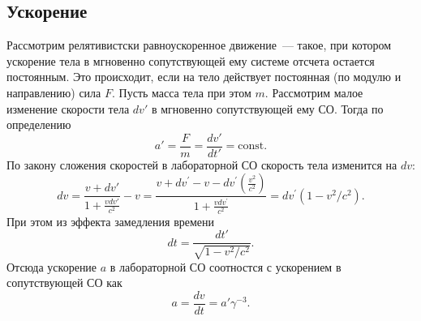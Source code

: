 \subsection{Ускорение}
Рассмотрим релятивистски равноускоренное движение~--- такое, при котором ускорение тела в мгновенно сопутствующей ему системе отсчета остается постоянным. Это происходит, если на тело действует постоянная (по модулю и направлению) сила $F$. Пусть масса тела при этом $m$. Рассмотрим малое изменение скорости тела $dv'$ в мгновенно сопутствующей ему СО. Тогда по определению
\begin{equation*}
	a' 
	   = \frac{F}{m} 
	   = \frac{dv'}{dt'} 
	   = \text{const}.
\end{equation*}
По закону сложения скоростей в лабораторной СО скорость тела изменится на $dv$:
\begin{equation*}
	dv = \frac{v+dv'}{1+\frac{v dv'}{c^2}} - v = \frac{v+d v^{\prime}-v-d v^{\prime}\left(\frac{v^2}{c^2}\right)}{1+\frac{v d v^{\prime}}{c^2}}=d v^{\prime}\left(1-v^2 / c^2\right).
\end{equation*}
При этом из эффекта замедления времени
\begin{equation*}
	dt = \frac{dt'}{\sqrt{1-v^2/c^2}}.
\end{equation*}
Отсюда ускорение $a$ в лабораторной СО соотностся с ускорением в сопутствующей СО как
\begin{equation}
	a = \frac{dv}{dt} = a' \gamma^{-3}.
\end{equation}